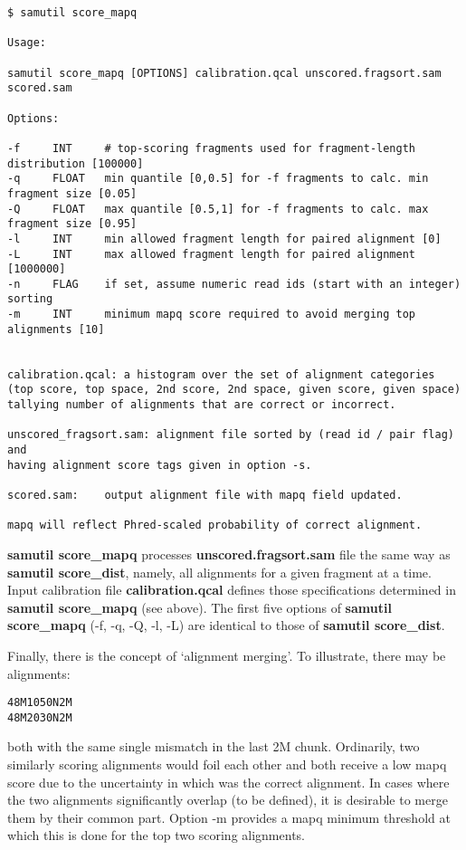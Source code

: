 \documentclass[10pt]{article}
\begin{document}
{\small
\begin{verbatim}
$ samutil score_mapq

Usage:

samutil score_mapq [OPTIONS] calibration.qcal unscored.fragsort.sam scored.sam

Options:

-f     INT     # top-scoring fragments used for fragment-length distribution [100000]
-q     FLOAT   min quantile [0,0.5] for -f fragments to calc. min fragment size [0.05]
-Q     FLOAT   max quantile [0.5,1] for -f fragments to calc. max fragment size [0.95]
-l     INT     min allowed fragment length for paired alignment [0]
-L     INT     max allowed fragment length for paired alignment [1000000]
-n     FLAG    if set, assume numeric read ids (start with an integer) sorting
-m     INT     minimum mapq score required to avoid merging top alignments [10]


calibration.qcal: a histogram over the set of alignment categories
(top score, top space, 2nd score, 2nd space, given score, given space)
tallying number of alignments that are correct or incorrect.

unscored_fragsort.sam: alignment file sorted by (read id / pair flag) and
having alignment score tags given in option -s.

scored.sam:    output alignment file with mapq field updated.

mapq will reflect Phred-scaled probability of correct alignment.
\end{verbatim}
}


\textbf{samutil score\_mapq} processes \textbf{unscored.fragsort.sam}
file the same way as \textbf{samutil score\_dist}, namely, all
alignments for a given fragment at a time. Input calibration file
\textbf{calibration.qcal} defines those specifications determined in
\textbf{samutil score\_mapq} (see above). The first five options of
\textbf{samutil score\_mapq} (-f, -q, -Q, -l, -L) are identical to
those of \textbf{samutil score\_dist}.

Finally, there is the concept of `alignment merging'. To illustrate,
there may be alignments:

{\small
\begin{verbatim}
48M1050N2M
48M2030N2M
\end{verbatim}
}


both with the same single mismatch in the last 2M chunk. Ordinarily,
two similarly scoring alignments would foil each other and both
receive a low mapq score due to the uncertainty in which was the
correct alignment. In cases where the two alignments significantly
overlap (to be defined), it is desirable to merge them by their common
part. Option -m provides a mapq minimum threshold at which this is
done for the top two scoring alignments.
\end{document}
